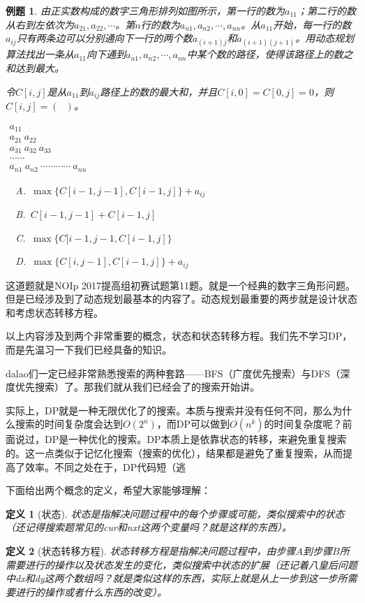 \documentclass{article}
\newtheorem{example}{例题}[subsection]
\newtheorem{definition}{定义}[subsection]
\theoremstyle{nonumberplain}
\begin{document}
\begin{example}由正实数构成的数字三角形排列如图所示，第一行的数为$a_{11}$；第二行的数从右到左依次为$a_{21},a_{22},\cdots$。第$n$行的数为$a_{n1},a_{n2},\cdots,a_{nn}$。从$a_{11}$开始，每一行的数$a_{ij}$只有两条边可以分别通向下一行的两个数$a_{(i+1)j}$和$a_{(i+1)(j+1)}$。用动态规划算法找出一条从$a_{11}$向下通到$a_{n1},a_{n2},\cdots,a_{nn}$中某个数的路径，使得该路径上的数之和达到最大。

	令$C[i,j]$是从$a_{11}$到$a_{ij}$路径上的数的最大和，并且$C[i,0]=C[0,j]=0$，则$C[i,j]=(\ \ \ )$。
	\begin{center}
		\begin{math}
			\begin{matrix}
				a_{11}                 \\
				a_{21}\ a_{22}         \\
				a_{31}\ a_{32}\ a_{33} \\
				\cdots\cdots           \\
				a_{n1}\ a_{n2}\ \cdots\cdots\cdots\cdots\ a_{nn}
			\end{matrix}
		\end{math}
	\end{center}

	\ \ A.\ $\max\{C[i-1,j-1],C[i-1,j]\}+a_{ij}$

	\ \ B.\ $C[i-1,j-1]+C[i-1,j]$

	\ \ C.\ $\max\{C[i-1,j-1,C[i-1,j]\}$

	\ \ D.\ $\max\{C[i,j-1],C[i-1,j]\}+a_{ij}$
\end{example}

这道题就是NOIp 2017提高组初赛试题第11题。就是一个经典的数字三角形问题。但是已经涉及到了动态规划最基本的内容了。动态规划最重要的两步就是设计状态和考虑状态转移方程。

以上内容涉及到两个非常重要的概念，状态和状态转移方程。我们先不学习DP，而是先温习一下我们已经具备的知识。

dalao们一定已经非常熟悉搜索的两种套路------BFS（广度优先搜索）与DFS（深度优先搜索）了。那我们就从我们已经会了的搜索开始讲。

实际上，DP就是一种无限优化了的搜索。本质与搜索并没有任何不同，那么为什么搜索的时间复杂度会达到$O(2^n)$，而DP可以做到$O(n^k)$的时间复杂度呢？前面说过，DP是一种优化的搜索。DP本质上是依靠状态的转移，来避免重复搜索的。这一点类似于记忆化搜索（搜索的优化），结果都是避免了重复搜索，从而提高了效率。不同之处在于，DP代码短（逃

下面给出两个概念的定义，希望大家能够理解：
\begin{definition}[状态]
	状态是指解决问题过程中的每个步骤或可能，类似搜索中的状态（还记得搜索题常见的cur和nxt这两个变量吗？就是这样的东西）。
\end{definition}
\begin{definition}[状态转移方程]
	状态转移方程是指解决问题过程中，由步骤$A$到步骤$B$所需要进行的操作以及状态发生的变化，类似搜索中状态的扩展（还记着八皇后问题中dx和dy这两个数组吗？就是类似这样的东西，实际上就是从上一步到这一步所需要进行的操作或者什么东西的改变）。
\end{definition}
\end{document}
